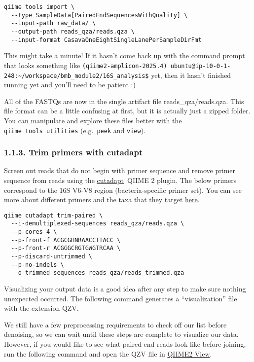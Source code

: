 \documentclass[
]{book}
\begin{document}
\begin{verbatim}
qiime tools import \
  --type SampleData[PairedEndSequencesWithQuality] \
  --input-path raw_data/ \
  --output-path reads_qza/reads.qza \
  --input-format CasavaOneEightSingleLanePerSampleDirFmt
\end{verbatim}

This might take a minute! If it hasn't come back up with the command prompt that looks something like \texttt{(qiime2-amplicon-2025.4)\ ubuntu@ip-10-0-1-248:\textasciitilde{}/workspace/bmb\_module2/16S\_analysis\$} yet, then it hasn't finished running yet and you'll need to be patient :)

All of the FASTQs are now in the single artifact file reads\_qza/reads.qza. This file format can be a little confusing at first, but it is actually just a zipped folder. You can manipulate and explore these files better with the \texttt{qiime\ tools\ utilities} (e.g.~\texttt{peek} and \texttt{view}).

\subsubsection{1.1.3. Trim primers with cutadapt}\label{trim-primers-with-cutadapt}

Screen out reads that do not begin with primer sequence and remove primer sequence from reads using the \href{http://cutadapt.readthedocs.io/en/stable/guide.html}{cutadapt}~QIIME 2 plugin. The below primers correspond to the 16S V6-V8 region (bacteria-specific primer set). You can see more about different primers and the taxa that they target \href{https://imr.bio/protocols.html}{here}.

\begin{verbatim}
qiime cutadapt trim-paired \
  --i-demultiplexed-sequences reads_qza/reads.qza \
  --p-cores 4 \
  --p-front-f ACGCGHNRAACCTTACC \
  --p-front-r ACGGGCRGTGWGTRCAA \
  --p-discard-untrimmed \
  --p-no-indels \
  --o-trimmed-sequences reads_qza/reads_trimmed.qza
\end{verbatim}

Visualizing your output data is a good idea after any step to make sure nothing unexpected occurred. The following command generates a ``visualization'' file with the extension QZV.

We still have a few preprocessing requirements to check off our list before denoising, so we can wait until these steps are complete to visualize our data. However, if you would like to see what paired-end reads look like before joining, run the following command and open the QZV file in \href{https://view.qiime2.org/}{QIIME2 View}.
\end{document}
